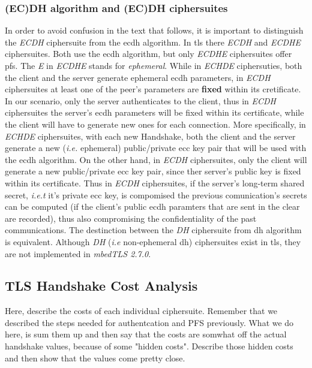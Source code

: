 \documentclass{llncs}
\begin{document}

\subsubsection{(EC)DH algorithm and (EC)DH ciphersuites}

In order to avoid confusion in the text that follows, it is important to distinguish the \textit{ECDH} ciphersuite from the \gls{ecdh} algorithm. 
In \gls{tls} there \textit{ECDH} and \textit{ECDHE} ciphersuites. Both use the \gls{ecdh} algorithm, but only \textit{ECDHE} ciphersuites offer \gls{pfs}.
The \textit{E} in \textit{ECDHE} stands for \textit{ephemeral}. While in \textit{ECHDE} ciphersuties, both the client and the server 
generate ephemeral \gls{ecdh} parameters, in \textit{ECDH} ciphersuites at least one of the peer's parameters are \textbf{fixed} 
within its cretificate. In our scenario, only the server authenticates to the client, thus in \textit{ECDH} ciphersuites the server's 
\gls{ecdh} parameters will be fixed within its certificate, while the client will have to generate new ones for each connection. 
More specifically, in \textit{ECHDE} ciphersuites, with each  new Handshake, both the client and the server generate a new (\textit{i.e.} ephemeral) 
public/private \gls{ecc} key pair that will be used with  the \gls{ecdh} algorithm. On the other hand, in \textit{ECDH} ciphersuites, only the client 
will generate a new public/private \gls{ecc} key pair, since ther server's public key is fixed within its certificate. Thus in \textit{ECDH} 
ciphersuites, if the server's long-term shared secret, \textit{i.e.t} it's private \gls{ecc} key, is compomised the previous comunication's secrets 
can be computed (if the client's public \gls{ecdh} paramters that are sent in the clear are recorded), thus also compromising the confidentiality of 
the past communications. The destinction between the \textit{DH} ciphersuite from \gls{dh} algorithm is equivalent. Although \textit{DH} (\textit{i.e}
non-ephemeral \gls{dh}) ciphersuites exist in \gls{tls}, they are not implemented in \textit{mbedTLS 2.7.0}.

\subsection{TLS Handshake Cost Analysis}

Here, describe the costs of each individual ciphersuite. Remember that we described the steps needed for authentcation and PFS previously.
What we do here, is sum them up and then say that the costs are somwhat off the actual handshake values, because of some "hidden costs".
Describe those hidden costs and then show that the values come pretty close.
\end{document}
